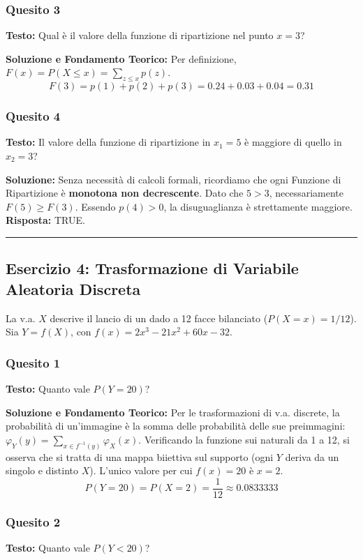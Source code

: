 \documentclass[12pt, a4paper]{article}
\begin{document}
\subsubsection*{Quesito 3}
\textbf{Testo:} Qual è il valore della funzione di ripartizione nel punto $x=3$?

\textbf{Soluzione e Fondamento Teorico:} 
Per definizione, $F(x) = P(X \le x) = \sum_{z \le x} p(z)$.
$$ F(3) = p(1) + p(2) + p(3) = 0.24 + 0.03 + 0.04 = 0.31 $$

\subsubsection*{Quesito 4}
\textbf{Testo:} Il valore della funzione di ripartizione in $x_1 = 5$ è maggiore di quello in $x_2 = 3$?

\textbf{Soluzione:}
Senza necessità di calcoli formali, ricordiamo che ogni Funzione di Ripartizione è \textbf{monotona non decrescente}. Dato che $5 > 3$, necessariamente $F(5) \ge F(3)$. Essendo $p(4) > 0$, la disuguaglianza è strettamente maggiore.
\textbf{Risposta:} TRUE.

\vspace{0.5cm}\hrule\vspace{0.5cm}

\subsection*{Esercizio 4: Trasformazione di Variabile Aleatoria Discreta}
La v.a. $X$ descrive il lancio di un dado a 12 facce bilanciato ($P(X=x) = 1/12$). 
Sia $Y = f(X)$, con $f(x) = 2x^3 - 21x^2 + 60x - 32$.

\subsubsection*{Quesito 1}
\textbf{Testo:} Quanto vale $P(Y=20)$?

\textbf{Soluzione e Fondamento Teorico:} 
Per le trasformazioni di v.a. discrete, la probabilità di un'immagine è la somma delle probabilità delle sue preimmagini: $\varphi_Y(y) = \sum_{x \in f^{-1}(y)} \varphi_X(x)$.
Verificando la funzione sui naturali da 1 a 12, si osserva che si tratta di una mappa biiettiva sul supporto (ogni $Y$ deriva da un singolo e distinto $X$). L'unico valore per cui $f(x) = 20$ è $x = 2$.
$$ P(Y=20) = P(X=2) = \frac{1}{12} \approx 0.0833333 $$

\subsubsection*{Quesito 2}
\textbf{Testo:} Quanto vale $P(Y < 20)$?
\end{document}
